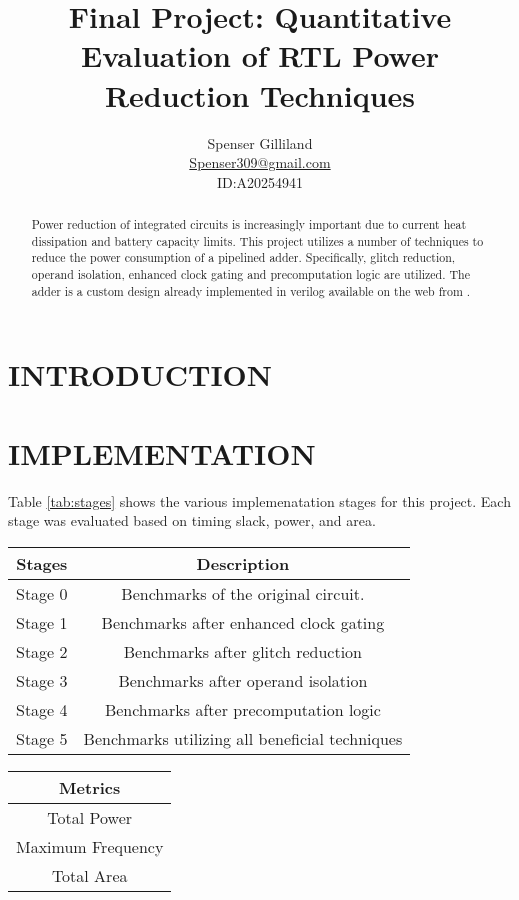 \documentclass[10pt,letterpaper]{article}
\author{Spenser Gilliland\\
\url{Spenser309@gmail.com}\\
ID:A20254941}
\title{Final Project: Quantitative Evaluation of RTL Power Reduction Techniques}
\begin{document}
\maketitle
\bigskip

\begin{abstract}
Power reduction of integrated circuits is increasingly important due to current heat dissipation and battery capacity limits.  This project utilizes a number of techniques to reduce the power consumption of a pipelined adder.  Specifically, glitch reduction, operand isolation, enhanced clock gating and precomputation logic are utilized. The adder is a custom design already implemented in verilog available on the web from \cite{code}.
\end{abstract}

\pagebreak

\section{INTRODUCTION}


\section{IMPLEMENTATION}

Table \ref{tab:stages} shows the various implemenatation stages for this project. Each stage was evaluated based on timing slack, power, and area.

\begin{center}
\begin{tabular}{|c|c|}
\hline Stages & Description \\
\hline 
\hline Stage 0 & Benchmarks of the original circuit. \\ 
\hline Stage 1 & Benchmarks after enhanced clock gating \\ 
\hline Stage 2 & Benchmarks after glitch reduction \\ 
\hline Stage 3 & Benchmarks after operand isolation \\ 
\hline Stage 4 & Benchmarks after precomputation logic \\ 
\hline Stage 5 & Benchmarks utilizing all beneficial techniques \\ 
\hline 
\end{tabular} 
\end{center}

\begin{center}
\begin{tabular}{|c|}
\hline Metrics \\
\hline 
\hline Total Power \\
\hline Maximum Frequency \\
\hline Total Area \\
\hline 
\end{tabular}
\end{center}
\end{document}
